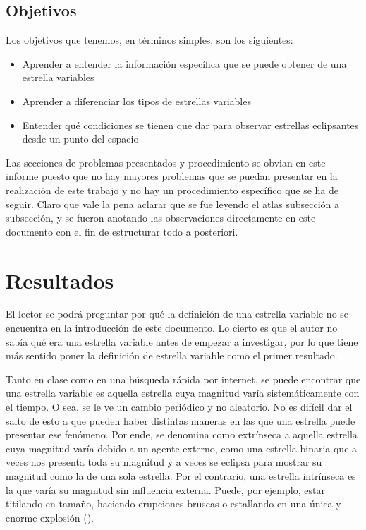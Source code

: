 \documentclass[10pt,twocolumn]{article}
\begin{document}
\subsection{Objetivos}

Los objetivos que tenemos, en términos simples, son los siguientes:
\begin{itemize}
    \item Aprender a entender la información específica que se puede obtener de una estrella variables
    \item Aprender a diferenciar los tipos de estrellas variables
    \item Entender qué condiciones se tienen que dar para observar estrellas eclipsantes desde un punto del espacio
\end{itemize}

Las secciones de problemas presentados y procedimiento se obvian en este informe puesto que no hay mayores problemas que se 
puedan presentar en la realización de este trabajo y no hay un procedimiento específico que se ha de seguir. Claro que vale 
la pena aclarar que se fue leyendo el atlas subsección a subsección, y se fueron anotando las observaciones directamente en 
este documento con el fin de estructurar todo a posteriori. 

\section{Resultados}

El lector se podrá preguntar por qué la definición de una estrella variable no se encuentra en la introducción de este documento.
Lo cierto es que el autor no sabía qué era una estrella variable antes de empezar a investigar, por lo que tiene más sentido poner
la definición de estrella variable como el primer resultado. 

Tanto en clase como en una búsqueda rápida por internet, se puede encontrar que una estrella variable es aquella estrella cuya magnitud
varía sistemáticamente con el tiempo. O sea, se le ve un cambio periódico y no aleatorio. No es difícil dar el salto de esto a que pueden 
haber distintas maneras en las que una estrella puede presentar ese fenómeno. Por ende, se denomina como extrínseca a aquella estrella
cuya magnitud varía debido a un agente externo, como una estrella binaria que a veces nos presenta toda su magnitud y a veces se eclipsa
para mostrar su magnitud como la de una sola estrella. Por el contrario, una estrella intrínseca es la que varía su magnitud sin influencia
externa. Puede, por ejemplo, estar titilando en tamaño, haciendo erupciones bruscas o estallando en una única y enorme explosión 
(\cite{clase_presencial, wikipedia_variable_star}). 
\end{document}
